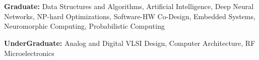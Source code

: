 \documentclass[letterpaper,11pt]{article}
\newcommand{\resumeSubHeadingListStart}{\begin{itemize}[leftmargin=0.01in, label={}]}
\newcommand{\resumeSubHeadingListEnd}{\end{itemize}}
\begin{document}
\section{\normalsize{\color{cvblue}{RELEVANT COURSEWORK}}}


\begin{itemize}[leftmargin=0.15in, label={}]
\vspace{2pt}
    \small{\item{
     \textbf{\normalsize{Graduate:}}{ \normalsize{Data Structures and Algorithms, Artificial Intelligence, Deep Neural Networks, NP-hard Optimizations, Software-HW Co-Design,  Embedded Systems, Neuromorphic Computing, Probabilistic Computing}} \\
    }}
    \vspace{1pt}
    \small{\item{
     \textbf{\normalsize{UnderGraduate:}}{ \normalsize{Analog and Digital VLSI Design, Computer Architecture, RF Microelectronics}} \\
    }}
    
 \end{itemize}
 \vspace{-15pt}
\end{document}
